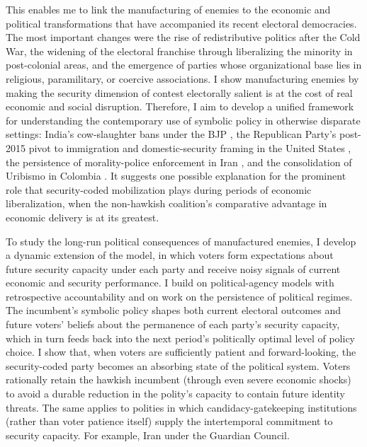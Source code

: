 \documentclass[11pt,twoside]{extarticle}
\begin{document}
This enables me to link the manufacturing of enemies to the economic and political transformations that have accompanied its recent electoral democracies. The most important changes were the rise of redistributive politics after the Cold War, the widening of the electoral franchise through liberalizing the minority in post-colonial areas, and the emergence of parties whose organizational base lies in religious, paramilitary, or coercive associations. I show manufacturing enemies by making the security dimension of contest electorally salient is at the cost of real economic and social disruption. Therefore, I aim to develop a unified framework for understanding the contemporary use of symbolic policy in otherwise disparate settings: India's cow-slaughter bans under the BJP \citep{jaffrelotModisIndiaHindu2021}, the Republican Party's post-2015 pivot to immigration and domestic-security framing in the United States \citep{sidesIdentityCrisis20162019,mutzStatusThreatNot2018}, the persistence of morality-police enforcement in Iran \citep{bajoghliIranReframedAnxieties2020}, and the consolidation of Uribismo in Colombia \citep*{acemogluMonopolyViolenceEvidence2013}. It suggests one possible explanation for the prominent role that security-coded mobilization plays during periods of economic liberalization, when the non-hawkish coalition's comparative advantage in economic delivery is at its greatest.


To study the long-run political consequences of manufactured enemies, I develop a dynamic extension of the model, in which voters form expectations about future security capacity under each party and receive noisy signals of current economic and security performance. I build on political-agency models with retrospective accountability and on work on the persistence of political regimes. The incumbent's symbolic policy shapes both current electoral outcomes and future voters' beliefs about the permanence of each party's security capacity, which in turn feeds back into the next period's politically optimal level of policy choice. I show that, when voters are sufficiently patient and forward-looking, the security-coded party becomes an absorbing state of the political system. Voters rationally retain the hawkish incumbent (through even severe economic shocks) to avoid a durable reduction in the polity's capacity to contain future identity threats. The same applies to polities in which candidacy-gatekeeping institutions (rather than voter patience itself) supply the intertemporal commitment to security capacity. For example, Iran under the Guardian Council.
\end{document}

